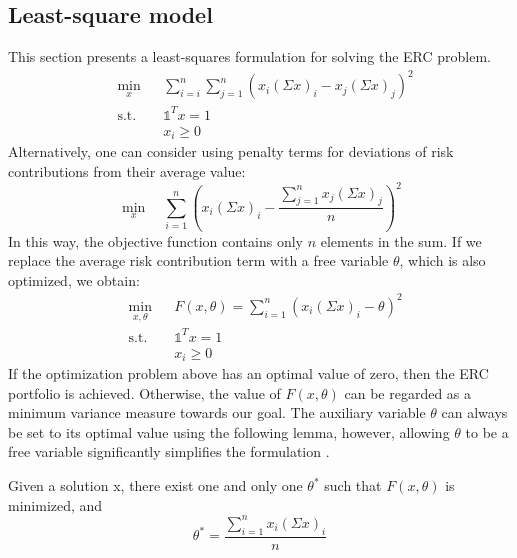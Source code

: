\subsection{Least-square model}
This section presents a least-squares formulation for solving the ERC problem.
\begin{equation}
\begin{aligned}
& \min_x
&& \sum_{i=i}^n \sum_{j=1}^{n}\left(x_i(\Sigma x)_i - x_j(\Sigma x)_j\right)^2\\
& \text{s.t.}
&&\mathds{1}^T x =1\\
&&&x_i \geq 0
\end{aligned}
\end{equation}
Alternatively, one can consider using penalty terms for deviations of risk contributions from their average value:
\begin{equation}\label{eq:ls1} 
\min_x \hspace{1em}\sum_{i=1}^{n}\left(x_i(\Sigma x)_i - \frac{\sum_{j=1}^{n} x_j(\Sigma x)_j}{n}\right)^2
\end{equation}
In this way, the objective function contains only $n$ elements in the sum. If we replace the average risk contribution term with a free variable $\theta$, which is also optimized, we obtain:
\begin{equation}\label{eq:ls}
\begin{aligned}
& \min_{x,\theta}
&& F(x,\theta) = \sum_{i=1}^n (x_i(\Sigma x)_i - \theta)^2\\
& \text{s.t.}
&&\mathds{1}^T x =1\\
&&&x_i \geq 0
\end{aligned}
\end{equation}
If the optimization problem above has an optimal value of zero, then the ERC portfolio is achieved. Otherwise, the value of $F(x,\theta)$ can be regarded as a minimum variance measure towards our goal. The auxiliary variable $\theta$ can always be set to its optimal value using the following lemma, however, allowing $\theta$ to be a free variable significantly simplifies the formulation \cite{tutuncu}. 
\begin{lemma} Given a solution x, there exist one and only one $\theta^*$ such that $F(x,\theta)$ is minimized, and
\begin{equation}
\theta^* = \frac{\sum_{i=1}^n x_i(\Sigma x)_i}{n}
\end{equation}
\end{lemma}

